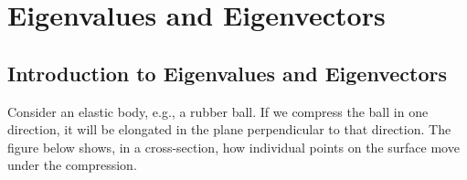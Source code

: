 \documentclass[
  a4paper,
  DIV=11,
  numbers=noendperiod,
  oneside]{scrreprt}
\theoremstyle{definition}
\theoremstyle{remark}
\begin{document}
\chapter{Eigenvalues and
Eigenvectors}\label{eigenvalues-and-eigenvectors}

\section{Introduction to Eigenvalues and
Eigenvectors}\label{introduction-to-eigenvalues-and-eigenvectors}

Consider an elastic body, e.g., a rubber ball. If we compress the ball
in one direction, it will be elongated in the plane perpendicular to
that direction. The figure below shows, in a cross-section, how
individual points on the surface move under the compression.
\end{document}

